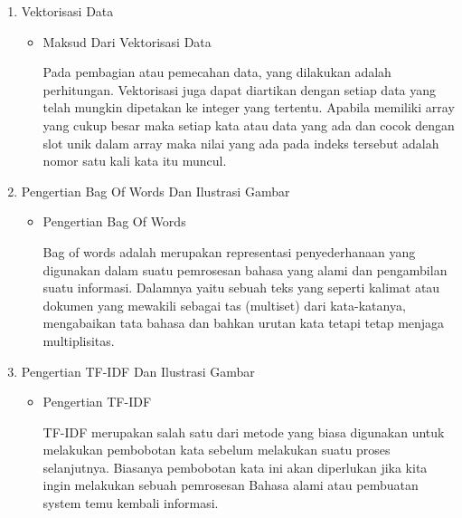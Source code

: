 \begin{enumerate}
\begin{itemize}
\par
\end{itemize}
\par
\par
\item Vektorisasi Data
\begin{itemize}
\item Maksud Dari Vektorisasi Data
\par Pada pembagian atau pemecahan data, yang dilakukan adalah perhitungan. Vektorisasi juga dapat diartikan dengan setiap data yang telah mungkin dipetakan ke integer yang  tertentu. Apabila memiliki array yang cukup besar maka setiap kata  atau data yang ada dan cocok dengan slot unik dalam array maka nilai yang ada pada indeks tersebut adalah nomor satu kali kata itu muncul.
\par
\end{itemize}
\par
\par
\item Pengertian Bag Of Words Dan Ilustrasi Gambar
\begin{itemize}
\item  Pengertian Bag Of Words
\par Bag of words adalah merupakan representasi penyederhanaan yang digunakan dalam  suatu pemrosesan bahasa yang alami dan pengambilan suatu informasi. Dalamnya yaitu sebuah teks yang seperti kalimat atau dokumen yang  mewakili sebagai tas (multiset) dari kata-katanya, mengabaikan tata bahasa dan bahkan urutan kata tetapi tetap menjaga multiplisitas.
\par
\end{itemize}
\par
\par
\item Pengertian TF-IDF Dan Ilustrasi Gambar
\begin{itemize}
\item  Pengertian TF-IDF
\par TF-IDF merupakan salah satu dari metode yang biasa digunakan untuk melakukan pembobotan kata sebelum melakukan suatu  proses selanjutnya. Biasanya pembobotan kata ini akan diperlukan jika kita ingin melakukan sebuah  pemrosesan Bahasa alami atau pembuatan system temu kembali informasi. 
\par
\end{itemize}
\par
\par
\end{enumerate}


